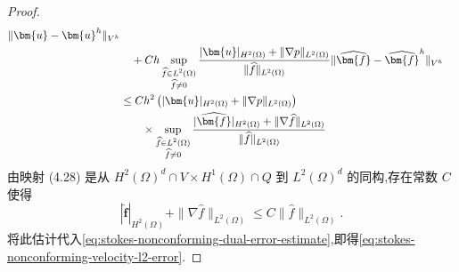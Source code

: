 \begin{proof}
{\begin{align}
       \|\bm{u}-\bm{u}^h\|_{V^h}\notag\\
  &\quad+Ch\sup_{\substack{\widehat f\in L^2(\Omega)\\\widehat f\ne0}}
   \frac{|\bm{u}|_{H^2(\Omega)}+\|\nabla p\|_{L^2(\Omega)}}
        {\|\widehat f\|_{L^2(\Omega)}}
       \|\widehat{\bm{f}}-\widehat{\bm{f}}^h\|_{V^h}
       \label{eq:stokes-nonconforming-dual-error-estimate}\\
  &\leq Ch^2\left(|\bm{u}|_{H^2(\Omega)}
       +\|\nabla p\|_{L^2(\Omega)}\right)\notag\\
  &\qquad\times
   \sup_{\substack{\widehat f\in L^2(\Omega)\\\widehat f\ne0}}
   \frac{|\widehat{\bm{f}}|_{H^2(\Omega)}
       +\|\nabla\widehat f\|_{L^2(\Omega)}}{\|\widehat f\|_{L^2(\Omega)}}\notag
\end{align}
}
由映射 (4.28) 是从 $H^2(\Omega)^d\cap V\times H^1(\Omega)\cap Q$ 到 $L^2(\Omega)^d$ 的同构,存在常数 $C$ 使得
\[
  |\widehat{\bm{f}}|_{H^2(\Omega)}
  +\|\nabla\widehat f\|_{L^2(\Omega)}
  \leq C\|\widehat f\|_{L^2(\Omega)}.
\]
将此估计代入\cref{eq:stokes-nonconforming-dual-error-estimate},即得\cref{eq:stokes-nonconforming-velocity-l2-error}.
\end{proof}

